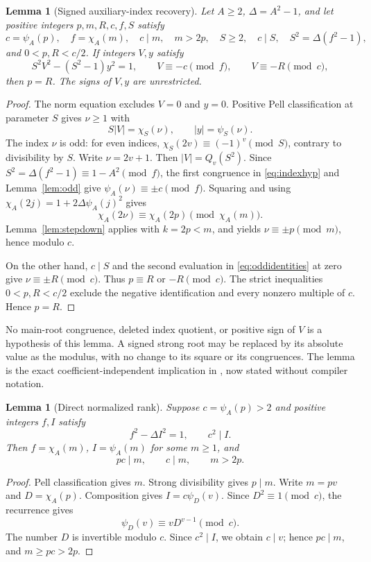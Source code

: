 \documentclass[11pt,a4paper]{article}
\newtheorem{lemma}[theorem]{Lemma}
\theoremstyle{definition}
\theoremstyle{remark}
\begin{document}
\begin{lemma}[Signed auxiliary-index recovery]
\label{lem:index}
Let \(A\ge2\), \(\Delta=A^2-1\), and let positive integers
\(p,m,R,c,f,S\) satisfy
\[
 c=\psi_A(p),\quad f=\chi_A(m),\quad
 c\mid m,\quad m>2p,\quad S\ge2,\quad c\mid S,\quad
 S^2=\Delta(f^2-1),
\]
and \(0<p,R<c/2\). If integers \(V,y\) satisfy
\begin{equation}
 S^2V^2-(S^2-1)y^2=1,\qquad
 V\equiv-c\pmod f,\qquad V\equiv-R\pmod c,    \label{eq:indexhyp}
\end{equation}
then \(p=R\). The signs of \(V,y\) are unrestricted.
\end{lemma}
\begin{proof}
The norm equation excludes \(V=0\) and \(y=0\).
Positive Pell classification at parameter \(S\) gives \(\nu\ge1\) with
\[
 S|V|=\chi_S(\nu),\qquad |y|=\psi_S(\nu).
\]
The index \(\nu\) is odd: for even indices,
\(\chi_S(2v)\equiv(-1)^v\pmod S\), contrary to divisibility by \(S\).
Write \(\nu=2v+1\). Then \(|V|=Q_v(S^2)\).
Since
\(S^2=\Delta(f^2-1)\equiv1-A^2\pmod f\), the first congruence in
\eqref{eq:indexhyp} and Lemma~\ref{lem:odd} give
\(\psi_A(\nu)\equiv\pm c\pmod f\). Squaring and using
\(\chi_A(2j)=1+2\Delta\psi_A(j)^2\) gives
\[
 \chi_A(2\nu)\equiv\chi_A(2p)\pmod{\chi_A(m)}.
\]
Lemma~\ref{lem:stepdown} applies with \(k=2p<m\), and yields
\(\nu\equiv\pm p\pmod m\), hence modulo \(c\).

On the other hand, \(c\mid S\) and the second evaluation in
\eqref{eq:oddidentities} at zero give
\(\nu\equiv\pm R\pmod c\). Thus \(p\equiv R\) or \(-R\pmod c\).
The strict inequalities \(0<p,R<c/2\) exclude the negative
identification and every nonzero multiple of \(c\). Hence \(p=R\).
\end{proof}

No main-root congruence, deleted index quotient, or positive sign of \(V\)
is a hypothesis of this lemma. A signed strong root may be replaced by
its absolute value as the modulus, with no change to its square or its
congruences. The lemma is the exact coefficient-independent implication
in \cite[Section 5]{ordinary,source57}, now stated without compiler
notation.

\begin{lemma}[Direct normalized rank]
\label{lem:rank}
Suppose \(c=\psi_A(p)>2\) and positive integers \(f,I\) satisfy
\[
 f^2-\Delta I^2=1,\qquad c^2\mid I.
\]
Then \(f=\chi_A(m)\), \(I=\psi_A(m)\) for some \(m\ge1\), and
\[
 pc\mid m,\qquad c\mid m,\qquad m>2p.
\]
\end{lemma}
\begin{proof}
Pell classification gives \(m\). Strong divisibility gives \(p\mid m\).
Write \(m=pv\) and \(D=\chi_A(p)\). Composition gives
\(I=c\psi_D(v)\). Since \(D^2\equiv1\pmod c\), the recurrence gives
\[
 \psi_D(v)\equiv vD^{v-1}\pmod c.
\]
The number \(D\) is invertible modulo \(c\). Since \(c^2\mid I\),
we obtain \(c\mid v\); hence \(pc\mid m\), and \(m\ge pc>2p\).
\end{proof}
\end{document}
